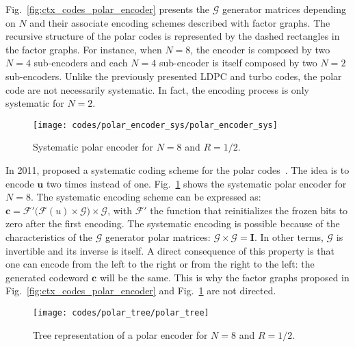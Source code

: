 Fig.~\ref{fig:ctx_codes_polar_encoder} presents the $\bm{\mathcal{G}}$ generator
matrices depending on $N$ and their associate encoding schemes described with
factor graphs. The recursive structure of the polar codes is represented by the
dashed rectangles in the factor graphs. For instance, when $N = 8$, the encoder
is composed by two $N = 4$ sub-encoders and each $N = 4$ sub-encoder is itself
composed by two $N = 2$ sub-encoders. Unlike the previously presented LDPC and
turbo codes, the polar code are not necessarily systematic. In fact, the
encoding process is only systematic for $N = 2$.

\begin{figure}[htp]
  \centering
  \texttt{[image: codes/polar\_encoder\_sys/polar\_encoder\_sys]}
  \caption{Systematic polar encoder for $N = 8$ and $R = 1/2$.}
  \label{fig:ctx_codes_polar_encoder_sys}
\end{figure}

In 2011, \Arikan proposed a systematic coding scheme for the polar
codes~\cite{Arikan2011}. The idea is to encode $\bm{u}$ two times instead of
one. Fig.~\ref{fig:ctx_codes_polar_encoder_sys} shows the systematic polar
encoder for $N = 8$. The systematic encoding scheme can be expressed as:
$\bm{c} = \mathcal{F'}\big(\mathcal{F}(u) \times \bm{\mathcal{G}}\big) \times
\bm{\mathcal{G}}$, with $\mathcal{F'}$ the function that reinitializes the
frozen bits to zero after the first encoding. The systematic encoding is
possible because of the characteristics of the $\bm{\mathcal{G}}$ generator
polar matrices: $\bm{\mathcal{G}} \times \bm{\mathcal{G}} = \bm{I}$. In other
terms, $\bm{\mathcal{G}}$ is invertible and its inverse is itself. A direct
consequence of this property is that one can encode from the left to the right
or from the right to the left: the generated codeword $\bm{c}$ will be the same.
This is why the factor graphs proposed in Fig.~\ref{fig:ctx_codes_polar_encoder}
and Fig.~\ref{fig:ctx_codes_polar_encoder_sys} are not directed.

\begin{figure}[htp]
  \centering
  \texttt{[image: codes/polar\_tree/polar\_tree]}
  \caption{Tree representation of a polar encoder for $N = 8$ and $R = 1/2$.}
  \label{fig:ctx_codes_polar_tree}
\end{figure}


